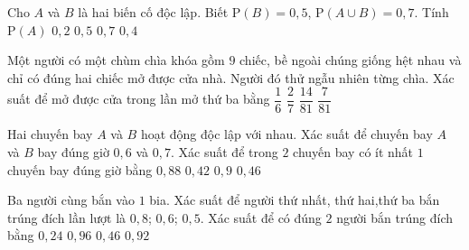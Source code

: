 \begin{ex}%
	Cho $A$ và $B$ là hai biến cố độc lập. Biết $\mathrm{P}(B)=0{,}5$, $\mathrm{P}(A\cup B)=0{,}7$. Tính $\mathrm{P}(A)$ 
	\choice 
		{$0{,}2$} 
		{$0{,}5$} 
		{$0{,}7$} 
		{\True  $0{,}4$}
\end{ex}

\begin{ex}%
	Một người có một chùm chìa khóa gồm $9$ chiếc, bề ngoài chúng giống hệt nhau và chỉ có đúng hai chiếc mở được cửa nhà. Người đó thử ngẫu  nhiên từng chìa. Xác suất để mở được cửa trong lần mở thứ ba bằng
	\choice 
		 {\True $\dfrac{1}{6}$}
		 {$\dfrac{2}{7}$}
		 {$\dfrac{14}{81}$}
		{$\dfrac{7}{81}$} 
\end{ex}

\begin{ex}%
	Hai chuyến bay $A$ và $B$ hoạt động độc lập với nhau. Xác suất để chuyến bay $A$ và $B$ bay đúng giờ $0{,}6$ và $0{,}7$. Xác suất để trong $2$ chuyến bay có ít nhất  $1$ chuyến bay đúng giờ bằng
	 \choice
		{\True  $0{,}88$}
		{$0{,}42$} 
		{$0{,}9$} 
		 {$0{,}46$}
\end{ex}

\begin{ex}%
	Ba người cùng bắn vào $1$ bia. Xác suất để người thứ nhất, thứ hai,thứ ba bắn trúng đích lần lượt là $0{,}8$; $0{,}6$; $0{,}5$. Xác suất  để có đúng $2$ người bắn trúng đích bằng
	\choice 
		 {$0{,}24$}
		 {$0{,}96$}
		{\True $0{,}46$} 
		 {$0{,}92$}
\end{ex}

